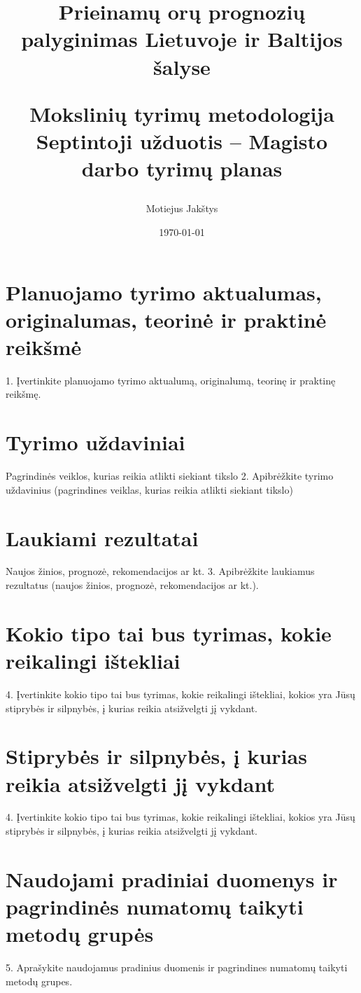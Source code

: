 \documentclass{article}
\title{
    Prieinamų orų prognozių palyginimas Lietuvoje ir Baltijos šalyse \\ \vspace{4mm}

    \large Mokslinių tyrimų metodologija\\
    Septintoji užduotis -- Magisto darbo tyrimų planas
}
\author{Motiejus Jakštys}
\date{\today}
\begin{document}
\maketitle

\newpage

\section{Planuojamo tyrimo aktualumas, originalumas, teorinė ir praktinė reikšmė}
1. Įvertinkite planuojamo tyrimo aktualumą, originalumą, teorinę ir praktinę reikšmę.

\section{Tyrimo uždaviniai}
{\small Pagrindinės veiklos, kurias reikia atlikti siekiant tikslo}
2. Apibrėžkite tyrimo uždavinius (pagrindines veiklas, kurias reikia atlikti siekiant tikslo)

\section{Laukiami rezultatai}
{\small Naujos žinios, prognozė, rekomendacijos ar kt.}
3. Apibrėžkite laukiamus rezultatus (naujos žinios, prognozė, rekomendacijos ar kt.).

\section{Kokio tipo tai bus tyrimas, kokie reikalingi ištekliai}
4. Įvertinkite kokio tipo tai bus tyrimas, kokie reikalingi ištekliai, kokios yra Jūsų stiprybės ir silpnybės, į kurias reikia atsižvelgti jį vykdant.

\section{Stiprybės ir silpnybės, į kurias reikia atsižvelgti jį vykdant}
4. Įvertinkite kokio tipo tai bus tyrimas, kokie reikalingi ištekliai, kokios yra Jūsų stiprybės ir silpnybės, į kurias reikia atsižvelgti jį vykdant.

\section{Naudojami pradiniai duomenys ir pagrindinės numatomų taikyti metodų grupės}
5. Aprašykite naudojamus pradinius duomenis ir pagrindines numatomų taikyti metodų grupes.
\end{document}
